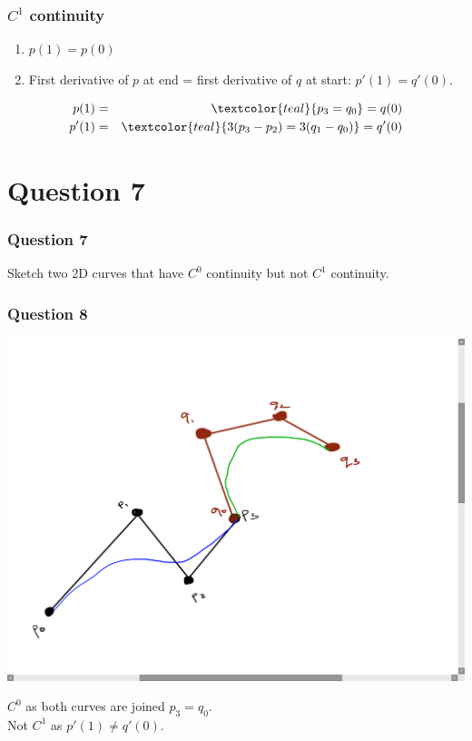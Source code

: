 \documentclass{beamer}
\begin{document}
\begin{frame}
    \frametitle{$C^1$ continuity}

    \begin{enumerate}
        \item $p(1) = p(0)$
        \item First derivative of $p$ at end = first derivative of $q$ at start: $p'(1) = q'(0)$.
    \end{enumerate}
    
    \begin{tcolorbox}
        \begin{eqnarray*}
            p(1) &=& \textcolor{teal}{p_3 = q_0} = q(0) \\
            p'(1) &=& \textcolor{teal}{3(p_3 - p_2) = 3(q_1 - q_0)} = q'(0)
        \end{eqnarray*}
    \end{tcolorbox}

\end{frame}

\section{Question 7}
\begin{frame}
    \frametitle{Question 7}
    Sketch two 2D curves that have $C^0$ continuity but not $C^1$ continuity.
\end{frame}

\begin{frame}
    \frametitle{Question 8}

    \centering
    \includegraphics[scale=0.2]{q7.png}
    \vspace{1em}

    $C^0$ as both curves are joined $p_3 = q_0$.\\
    Not $C^1$ as $p'(1) \neq q'(0)$.

\end{frame}
\end{document}
